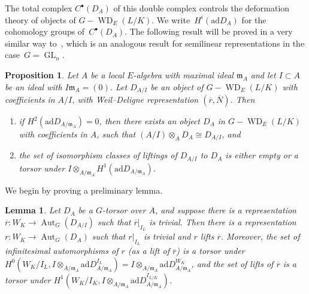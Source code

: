 \documentclass{amsart}
\def\ad{\mathrm{ad}}
\newtheorem{lemma}[subsubsection]{Lemma}
\newtheorem{prop}[subsubsection]{Proposition}
\theoremstyle{definition}
\theoremstyle{remark}
\newcommand{\mar}[1]{}
\newcommand{\mar}[1]{\marginpar{\raggedright\tiny squirrel #1}}
\DeclareMathOperator{\Aut}{Aut}
\DeclareMathOperator{\GL}{GL}
\DeclareMathOperator{\WD}{WD}
\begin{document}
The total complex
$C^\bullet(D_A)$ of this double complex controls the deformation
theory of objects of $G-\WD_E(L/K)$.  We write~$H^i(\ad D_A)$ for the
cohomology groups of~$C^\bullet(D_A)$. The following result will be proved
in a very similar way to~\cite[Proposition 3.1.2]{MR2373358}, which is
an analogous result for semilinear representations in the case~$G=\GL_n$.
\begin{prop}\label{prop: deformations of WD repns controlled by complex}
Let $A$ be a local $E$-algebra with maximal ideal $\mathfrak{m}_A$ and let $I\subset A$ be an ideal with $I\mathfrak{m}_A=(0)$.  Let $D_{A/I}$ be an object of $G-\WD_E(L/K)$ with coefficients in $A/I$, with Weil--Deligne representation $(\overline r,\overline N)$. Then
\begin{enumerate}
\item	if $H^2(\ad D_{A/\mathfrak{m}_A})=0$, then there exists an object
  $D_A$ in $G-\WD_E(L/K)$ with coefficients in $A$, such that
  $(A/I)\otimes_AD_A\cong D_{A/I}$, and
\item	the set of isomorphism classes of liftings of $D_{A/I}$ to
  $D_A$ is either empty or a torsor under
  $I\otimes_{A/\mathfrak{m}_A}H^1(\ad D_{A/\mathfrak{m}_A})$.
\end{enumerate}
\end{prop}
We begin by proving a preliminary lemma.%
\begin{lemma}\label{lem: Weil representations lift}
Let $D_A$ be a $G$-torsor over $A$, and suppose there is a representation $\overline r:W_K\rightarrow \Aut_G(D_{A/I})$ such that $\overline r|_{I_L}$ is trivial.  Then there is a representation $r:W_K\rightarrow \Aut_G(D_A)$ such that $r|_{I_L}$ is trivial and $r$ lifts $\overline r$.  Moreover, the set of infinitesimal automorphisms of $r$ \emph{(}as a lift of $\overline r$\emph{)} is a torsor under $H^0(W_K/I_{L},I\otimes_{A/\mathfrak{m}_A}\ad D_{A/\mathfrak{m}_A}^{I_{L}})=I\otimes_{A/\mathfrak{m}_A}\ad D_{A/\mathfrak{m}_A}^{W_K}$, and the set of lifts of $\overline r$ is a torsor under $H^1(W_K/I_{K},I\otimes_{A/\mathfrak{m}_A}\ad D_{A/\mathfrak{m}_A}^{I_{L/K}})$.
\end{lemma}
\end{document}
